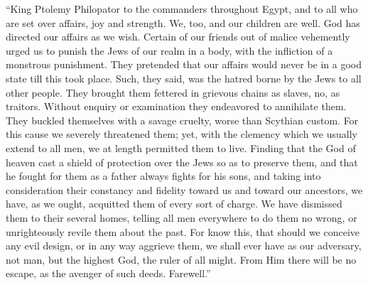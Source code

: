  ``King Ptolemy Philopator to the commanders throughout
Egypt, and to all who are set over affairs, joy and strength.
 We, too, and our children are well. God has directed our
affairs as we wish.  Certain of our friends out of malice
vehemently urged us to punish the Jews of our realm in a body, with the
infliction of a monstrous punishment.  They pretended that
our affairs would never be in a good state till this took place. Such,
they said, was the hatred borne by the Jews to all other people.
 They brought them fettered in grievous chains as slaves,
no, as traitors. Without enquiry or examination they endeavored to
annihilate them. They buckled themselves with a savage cruelty, worse
than Scythian custom.  For this cause we severely
threatened them; yet, with the clemency which we usually extend to all
men, we at length permitted them to live. Finding that the God of heaven
cast a shield of protection over the Jews so as to preserve them, and
that he fought for them as a father always fights for his sons,
 and taking into consideration their constancy and
fidelity toward us and toward our ancestors, we have, as we ought,
acquitted them of every sort of charge.  We have dismissed
them to their several homes, telling all men everywhere to do them no
wrong, or unrighteously revile them about the past.  For
know this, that should we conceive any evil design, or in any way
aggrieve them, we shall ever have as our adversary, not man, but the
highest God, the ruler of all might. From Him there will be no escape,
as the avenger of such deeds. Farewell.''

